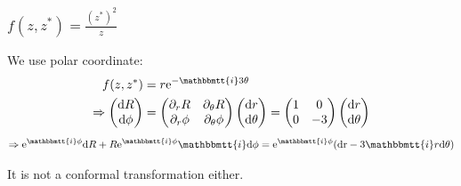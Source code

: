\documentclass[]{ctexart}
\newcommand{\mi}{\mathbbmtt{i}}
\newcommand{\di}{\mathrm{d}}
\newcommand{\pa}{\partial}
\newcommand{\me}{\mathrm{e}}
\begin{document}
		\subsubsection{$f(z,z^*)=\frac{(z^*)^2}{z}$}
			We use polar coordinate:
				\begin{equation*}
				\begin{aligned}
					f(z,z^*)&=r \me ^{-\mi 3\theta}\\
					\Rightarrow 
					\begin{pmatrix}
						\di R\\
						\di \phi
					\end{pmatrix}
					&=
					\begin{pmatrix}
						\pa_rR & \pa_{\theta}R\\
						\pa_r\phi & \pa_{\theta}\phi
					\end{pmatrix}
					\begin{pmatrix}
						\di r\\
						\di \theta
					\end{pmatrix}
					=
					\begin{pmatrix}
						1 & 0\\
						0 & -3
					\end{pmatrix}
					\begin{pmatrix}
						\di r\\
						\di \theta
					\end{pmatrix}
				\end{aligned}
				\end{equation*}
				\begin{equation*}
				\begin{aligned}
					\Rightarrow \me ^{\mi \phi }\di R+R\me ^{\mi \phi}\mi \di \phi=\me ^{\mi \phi}(\text{dr}-3\mi  r\text{d}\theta)
				\end{aligned}
				\end{equation*}
			
			It is not a conformal transformation either.
			
\end{document}
